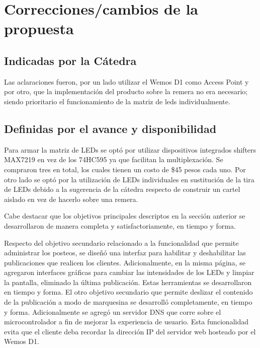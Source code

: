 \section{Correcciones/cambios de la propuesta}


    \subsection{Indicadas por la Cátedra}
    
    Las aclaraciones fueron, por un lado utilizar el Wemos D1 como Access Point y por otro, que la implementación del producto sobre la remera no era necesario; siendo prioritario el funcionamiento de la matriz de leds individualmente.
    
    
    \subsection{Definidas por el avance y disponibilidad}
    
    Para armar la matriz de LEDs se optó por utilizar dispositivos integrados shifters MAX7219 en vez de los 74HC595 ya que facilitan la multiplexación. Se compraron tres en total, los cuales tienen un costo de \$45 pesos cada uno. Por otro lado se optó por la utilización de LEDs individuales en sustitución de la tira de LEDs debido a la sugerencia de la cátedra respecto de construir un cartel aislado en vez de hacerlo sobre una remera.
    
    
    
    Cabe destacar que los objetivos principales descriptos en la sección anterior se desarrollaron de manera completa y satisfactoriamente, en tiempo y forma.
    
    Respecto del objetivo secundario relacionado a la funcionalidad que permite administrar los posteos, se diseñó una interfaz para habilitar y deshabilitar las publicaciones que realicen los clientes. Adicionalmente, en la misma página, se agregaron interfaces gráficas para cambiar las intensidades de los LEDs y limpiar la pantalla, eliminado la última publicación. Estas herramientas se desarrollaron en tiempo y forma. El otro objetivo secundario que permite deslizar el contenido de la publicación a modo de marquesina se desarrolló completamente, en tiempo y forma. Adicionalmente se agregó un servidor DNS que corre sobre el microcontrolador a fin de mejorar la experiencia de usuario. Esta funcionalidad evita que el cliente deba recordar la dirección IP del servidor web hosteado por el Wemos D1.
    
